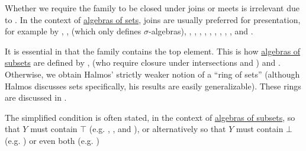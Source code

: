 \begin{comments}
  \item Whether we require the family to be closed under joins or meets is irrelevant due to . In the context of \hyperref[def:algebra_of_subsets]{algebras of sets}, joins are usually preferred for presentation, for example by
  ,
  ,
   (which only defines \( \sigma \)-algebras),
  ,
  ,
  ,
  ,
  ,
  ,
  ,
  ,
  ,
   and
  .

  \item It is essential in  that the family contains the top element. This is how \hyperref[def:algebra_of_subsets]{algebras of subsets} are defined by
  ,
   (who require closure under intersections and ) and
  .
  Otherwise, we obtain Halmos' strictly weaker notion of a \enquote{ring of sets} (although Halmos discusses sets specifically, his results are easily generalizable). These rings are discussed in .

  \item The simplified condition  is often stated, in the context of \hyperref[def:algebra_of_subsets]{algebras of subsets}, so that \( Y \) must contain \( \top \) (e.g. , ,  and ), or alternatively so that \( Y \) must contain \( \bot \) (e.g. ) or even both (e.g. )
\end{comments}
